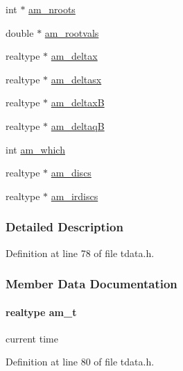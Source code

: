 \begin{DoxyCompactItemize}
\item 
int $\ast$ \hyperlink{struct_temp_data_af329293bdb28f52dcaeb04355dc5c69e}{am\+\_\+nroots}
\item 
double $\ast$ \hyperlink{struct_temp_data_a9cf09c47af8f82be3bba711720009efe}{am\+\_\+rootvals}
\item 
realtype $\ast$ \hyperlink{struct_temp_data_ab432281618cfe0f7dd7db1d8eb5ec227}{am\+\_\+deltax}
\item 
realtype $\ast$ \hyperlink{struct_temp_data_a96e5e38eb662e4b1390a14693e17ece5}{am\+\_\+deltasx}
\item 
realtype $\ast$ \hyperlink{struct_temp_data_a75047d78cee16ec77b9aae2cf0a25964}{am\+\_\+deltax\+B}
\item 
realtype $\ast$ \hyperlink{struct_temp_data_adfe8df7debe43dd76c29e4976b1f1ae7}{am\+\_\+deltaq\+B}
\item 
int \hyperlink{struct_temp_data_a961819e25ceef7e842c469cbedccb19f}{am\+\_\+which}
\item 
realtype $\ast$ \hyperlink{struct_temp_data_aeb8b1beb27f1b20bda3d7de494f58c41}{am\+\_\+discs}
\item 
realtype $\ast$ \hyperlink{struct_temp_data_ad64693949a923975059d0d0c49e854f9}{am\+\_\+irdiscs}
\end{DoxyCompactItemize}


\subsubsection{Detailed Description}


Definition at line 78 of file tdata.\+h.



\subsubsection{Member Data Documentation}
\hypertarget{struct_temp_data_ae0484650df254ad9cd8883e2ba028892}{}
\paragraph[{am\+\_\+t}]{\setlength{\rightskip}{0pt plus 5cm}realtype am\+\_\+t}\label{struct_temp_data_ae0484650df254ad9cd8883e2ba028892}
current time 

Definition at line 80 of file tdata.\+h.

\hypertarget{struct_temp_data_a4527d9abde45ba3982c35d2c12969d36}{}
